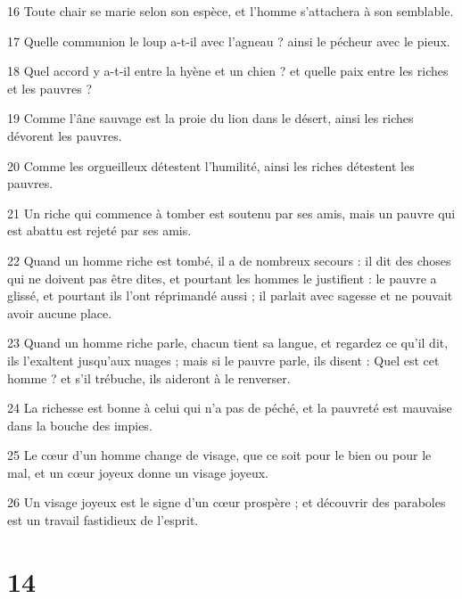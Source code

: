 \par 16 Toute chair se marie selon son espèce, et l'homme s'attachera à son semblable.
\par 17 Quelle communion le loup a-t-il avec l'agneau ? ainsi le pécheur avec le pieux.
\par 18 Quel accord y a-t-il entre la hyène et un chien ? et quelle paix entre les riches et les pauvres ?
\par 19 Comme l'âne sauvage est la proie du lion dans le désert, ainsi les riches dévorent les pauvres.
\par 20 Comme les orgueilleux détestent l'humilité, ainsi les riches détestent les pauvres.
\par 21 Un riche qui commence à tomber est soutenu par ses amis, mais un pauvre qui est abattu est rejeté par ses amis.
\par 22 Quand un homme riche est tombé, il a de nombreux secours : il dit des choses qui ne doivent pas être dites, et pourtant les hommes le justifient : le pauvre a glissé, et pourtant ils l'ont réprimandé aussi ; il parlait avec sagesse et ne pouvait avoir aucune place.
\par 23 Quand un homme riche parle, chacun tient sa langue, et regardez ce qu'il dit, ils l'exaltent jusqu'aux nuages ​​; mais si le pauvre parle, ils disent : Quel est cet homme ? et s'il trébuche, ils aideront à le renverser.
\par 24 La richesse est bonne à celui qui n'a pas de péché, et la pauvreté est mauvaise dans la bouche des impies.
\par 25 Le cœur d'un homme change de visage, que ce soit pour le bien ou pour le mal, et un cœur joyeux donne un visage joyeux.
\par 26 Un visage joyeux est le signe d'un cœur prospère ; et découvrir des paraboles est un travail fastidieux de l'esprit.

\chapter{14}

